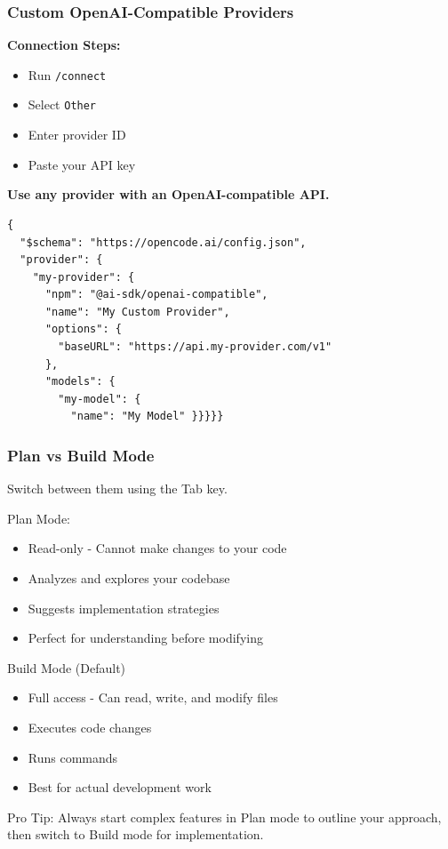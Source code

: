 \begin{frame}[fragile]\frametitle{Custom OpenAI-Compatible Providers}

\textbf{Connection Steps:}
\begin{itemize}
    \item Run \texttt{/connect}
    \item Select \texttt{Other}
    \item Enter provider ID
    \item Paste your API key
\end{itemize}

\textbf{Use any provider with an OpenAI-compatible API.}

\begin{lstlisting}
{
  "$schema": "https://opencode.ai/config.json",
  "provider": {
    "my-provider": {
      "npm": "@ai-sdk/openai-compatible",
      "name": "My Custom Provider",
      "options": {
        "baseURL": "https://api.my-provider.com/v1"
      },
      "models": {
        "my-model": {
          "name": "My Model" }}}}}
\end{lstlisting}



\end{frame}

\begin{frame}[fragile]\frametitle{Plan vs Build Mode}

Switch between them using the Tab key.

Plan Mode:
  \begin{itemize}
    \item Read-only - Cannot make changes to your code
    \item Analyzes and explores your codebase
    \item Suggests implementation strategies
    \item Perfect for understanding before modifying
  \end{itemize}
  
Build Mode (Default)
  \begin{itemize}
    \item Full access - Can read, write, and modify files
    \item Executes code changes
    \item Runs commands
    \item Best for actual development work
  \end{itemize}  
  
Pro Tip: Always start complex features in Plan mode to outline your approach, then switch to Build mode for implementation.  
\end{frame}

